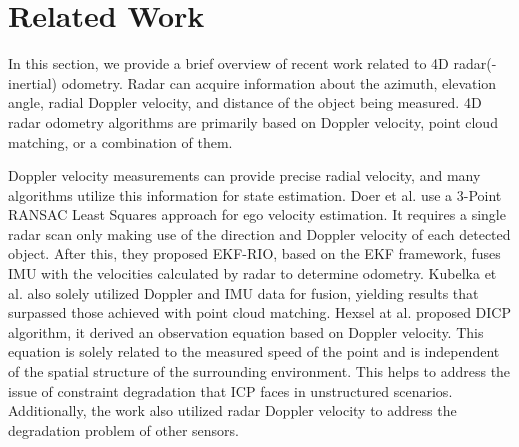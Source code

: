 \section{Related Work}
In this section, we provide a brief overview of recent work related to 4D radar(-inertial) odometry. Radar can acquire information about the azimuth, elevation angle, radial Doppler velocity, and distance of the object being measured.
 4D radar odometry algorithms are primarily based on Doppler velocity, point cloud matching, or a combination of them.

Doppler velocity measurements can provide precise radial velocity, and many algorithms utilize this information for state estimation. Doer et al.\cite{DoerMFI2020} use a 3-Point RANSAC Least Squares approach for ego velocity estimation. It requires a single radar scan only making use of the direction and Doppler velocity of each detected object. After this, they proposed EKF-RIO\cite{DoerENC2020}\cite{DoerJGN2022}, based on the EKF framework, fuses IMU with the velocities calculated by radar to determine odometry. Kubelka et al.\cite{kubelka2023we,yoon2023need,wu2022picking,ng2021continuous} also solely utilized Doppler and IMU data for fusion, yielding results that surpassed those achieved with point cloud matching. Hexsel at al. proposed DICP algorithm\cite{hexsel2022dicp}, it derived an observation equation based on Doppler velocity. This equation is solely related to the measured speed of the point and is independent of the spatial structure of the surrounding environment. This helps to address the issue of constraint degradation that ICP faces in unstructured scenarios.
Additionally, the work \cite{nissov2024degradation,kramer2020radar,huang2024multi,hong2021radar} also utilized radar Doppler velocity to address the degradation problem of other sensors.

